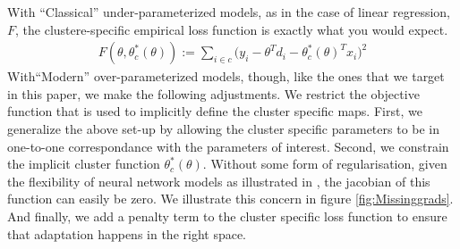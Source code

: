 \documentclass[a4paper,12pt]{article}
\begin{document}
With “Classical” under-parameterized models, as in the case of linear regression, $F$, the clustere-specific empirical loss function is exactly what you would expect. 
\begin{align*}
    F(\theta, \theta_c^*(\theta)) := \sum _{i \in c}\big(y_i - \theta^Td_i - \theta _c^*(\theta)^Tx_i \big)^2
\end{align*}
 With“Modern” over-parameterized models, though, like the ones that we target in this paper, we make the following adjustments. 
 We restrict the objective function that is used to implicitly define the cluster specific maps. First, we generalize the above set-up by allowing the cluster specific parameters to be in one-to-one correspondance with the parameters of interest. Second, we constrain the implicit cluster function $\theta_c^*(\theta)$. Without some form of regularisation, given the flexibility of neural network models as illustrated in \cite{zhang2021understanding}, the jacobian of this function can easily be zero. We illustrate this concern in figure \ref{fig:Missinggrads}. And finally, we add a penalty term to the cluster specific loss function to ensure that adaptation happens in the right space. 
 
\end{document}
